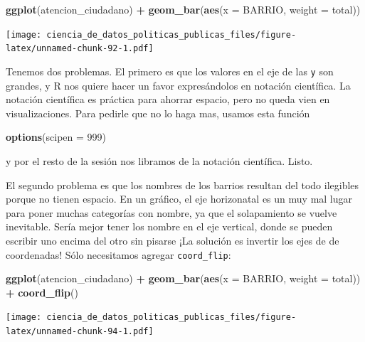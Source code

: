 \documentclass[]{book}
\newenvironment{Shaded}{\begin{snugshade}}{\end{snugshade}}
\newcommand{\KeywordTok}[1]{\textcolor[rgb]{0.13,0.29,0.53}{\textbf{#1}}}
\newcommand{\DataTypeTok}[1]{\textcolor[rgb]{0.13,0.29,0.53}{#1}}
\newcommand{\DecValTok}[1]{\textcolor[rgb]{0.00,0.00,0.81}{#1}}
\newcommand{\StringTok}[1]{\textcolor[rgb]{0.31,0.60,0.02}{#1}}
\newcommand{\OperatorTok}[1]{\textcolor[rgb]{0.81,0.36,0.00}{\textbf{#1}}}
\newcommand{\NormalTok}[1]{#1}
\begin{document}
\begin{Shaded}
\begin{Highlighting}[]
\KeywordTok{ggplot}\NormalTok{(atencion_ciudadano) }\OperatorTok{+}
\StringTok{    }\KeywordTok{geom_bar}\NormalTok{(}\KeywordTok{aes}\NormalTok{(}\DataTypeTok{x =}\NormalTok{ BARRIO, }\DataTypeTok{weight =}\NormalTok{ total))}
\end{Highlighting}
\end{Shaded}

\texttt{[image: ciencia\_de\_datos\_politicas\_publicas\_files/figure-latex/unnamed-chunk-92-1.pdf]}

Tenemos dos problemas. El primero es que los valores en el eje de las
\texttt{y} son grandes, y R nos quiere hacer un favor expresándolos en
notación científica. La notación científica es práctica para ahorrar
espacio, pero no queda vien en visualizaciones. Para pedirle que no lo
haga mas, usamos esta función

\begin{Shaded}
\begin{Highlighting}[]
\KeywordTok{options}\NormalTok{(}\DataTypeTok{scipen =} \DecValTok{999}\NormalTok{)}
\end{Highlighting}
\end{Shaded}

y por el resto de la sesión nos libramos de la notación científica.
Listo.

El segundo problema es que los nombres de los barrios resultan del todo
ilegibles porque no tienen espacio. En un gráfico, el eje horizonatal es
un muy mal lugar para poner muchas categorías con nombre, ya que el
solapamiento se vuelve inevitable. Sería mejor tener los nombre en el
eje vertical, donde se pueden escribir uno encima del otro sin pisarse
¡La solución es invertir los ejes de de coordenadas! Sólo necesitamos
agregar \texttt{coord\_flip}:

\begin{Shaded}
\begin{Highlighting}[]
\KeywordTok{ggplot}\NormalTok{(atencion_ciudadano) }\OperatorTok{+}
\StringTok{    }\KeywordTok{geom_bar}\NormalTok{(}\KeywordTok{aes}\NormalTok{(}\DataTypeTok{x =}\NormalTok{ BARRIO, }\DataTypeTok{weight =}\NormalTok{ total)) }\OperatorTok{+}
\StringTok{    }\KeywordTok{coord_flip}\NormalTok{()}
\end{Highlighting}
\end{Shaded}

\texttt{[image: ciencia\_de\_datos\_politicas\_publicas\_files/figure-latex/unnamed-chunk-94-1.pdf]}
\end{document}
